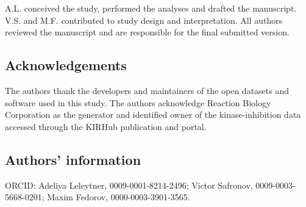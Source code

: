 \documentclass[11pt]{article}
\begin{document}
A.L. conceived the study, performed the analyses and drafted the manuscript. V.S. and M.F.
contributed to study design and interpretation. All authors reviewed the manuscript and are
responsible for the final submitted version.

\subsection*{Acknowledgements}

The authors thank the developers and maintainers of the open datasets and software used in
this study. The authors acknowledge Reaction Biology Corporation as the generator and
identified owner of the kinase-inhibition data accessed through the KIRHub publication and
portal.

\subsection*{Authors' information}

ORCID: Adeliya Leleytner, 0009-0001-8214-2496; Victor Safronov,
0009-0003-5668-0201; Maxim Fedorov, 0000-0003-3901-3565.
\end{document}
